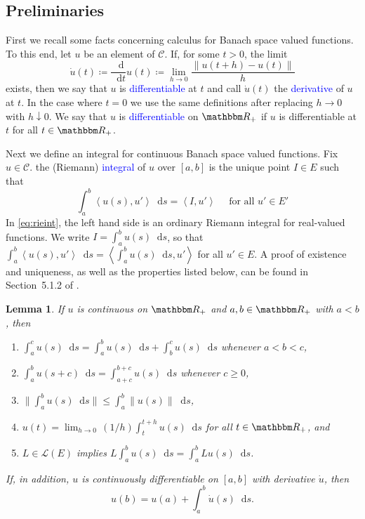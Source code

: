 \documentclass[12pt, reqno]{amsart}
\renewcommand{\leq}{\leqslant}
\renewcommand{\geq}{\geqslant}
\providecommand{\inner}[1]{\left\langle{#1}\right\rangle}
\newcommand{\1}{\mathbbm 1}
\newcommand*\diff{\mathop{}\!\mathrm{d}}
\newcommand{\cC}{\mathscr C}
\newcommand{\lL}{\mathcal L}
\newcommand{\RR}{\mathbbm R}
\theoremstyle{plain}
\newtheorem{lemma}[theorem]{Lemma}
\theoremstyle{definition}
\newcommand{\navy}[1]{\textcolor{blue}{#1}}
\begin{document}
\subsection{Preliminaries}\label{ss:prel}

First we recall some facts concerning calculus for Banach space valued
functions. To this end, let $u$ be an element of $\cC$. If, for some $t > 0$,
the limit
%
\begin{equation*}
    \dot u(t)
    \coloneq \frac{\diff }{\diff t} u(t)
    \coloneq \lim_{h \to 0} \frac{\| u(t + h) - u(t) \|}{h}
\end{equation*}
%
exists, then we say that $u$ is \navy{differentiable} at $t$ and call $\dot u(t)$
the \navy{derivative} of $u$ at $t$.  In the case where $t=0$ we use the same
definitions after replacing $h \to 0$ with $h \downarrow 0$.
We say that $u$ is \navy{differentiable} on $\RR_+$ if $u$ is differentiable at
$t$ for all $t \in \RR_+$.

Next we define an integral for continuous Banach space valued functions. Fix $u
\in \cC$.  the (Riemann) \navy{integral} of $u$ over $[a,b]$ is the unique point
$I \in E$ such that
%
\begin{equation}\label{eq:rieint}
    \int_a^b \inner{u(s), u'} \diff s = \inner{I, u'} 
    \quad \text{ for all } u' \in E'
\end{equation}
%
In \eqref{eq:rieint}, the left hand side is an ordinary Riemann integral for
real-valued functions.  
We write $I = \int_a^b u(s) \diff s$, so that $
\int_a^b \inner{u(s), u'} \diff s = \inner{\int_a^b u(s) \diff s, u'}$ for all
$u' \in E$.  A proof of existence and uniqueness, as well as the properties
listed below, can be found in Section~5.1.2 of \cite{buhler2018functional}.

\begin{lemma}\label{l:riemann}
    If $u$ is continuous on $\RR_+$ and $a, b \in \RR_+$ with $a < b$, then
    \begin{enumerate}
        \item $\int_a^c u(s) \diff s 
            = \int_a^b u(s) \diff s + \int_b^c u(s) \diff s$ whenever $a < b < c$,
        \item $\int_a^b u(s + c) \diff s = \int_{a+c}^{b+c} u(s)
            \diff s$ whenever $c \geq 0$,
        \item $\| \int_a^b u(s) \diff s \| \leq \int_a^b \|
            u(s)  \| \diff s$,
        \item $u(t) = \lim_{h \to 0} \, (1/h) \int_t^{t+h} u(s) \diff s$ for all
            $t \in \RR_+$, and
        \item $L \in \lL(E)$ implies $L \int_a^b u(s) \diff s = \int_a^b Lu(s) \diff s $.
    \end{enumerate}
    If, in addition, $u$ is continuously differentiable on $[a, b]$ with
    derivative $\dot u$, then
    \begin{equation}\label{eq:ftcb}
        u(b) = u(a) + \int_a^b \dot u(s) \diff s.
    \end{equation}
\end{lemma}
\end{document}
